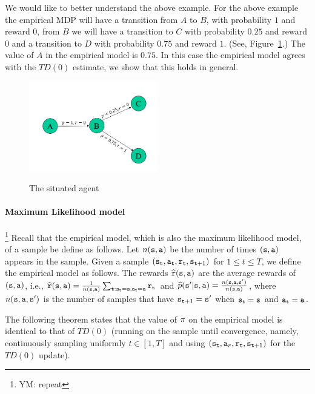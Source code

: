 We would like to better understand the above example. For the above
example the empirical MDP will have a transition from $A$ to $B$,
with probability $1$ and reward $0$, from $B$ we will have a
transition to $C$ with probability $0.25$ and reward $0$ and a
transition to $D$ with probability $0.75$ and reward $1$. (See,
Figure~\ref{fig:L7-ML}.) The value of $A$ in the empirical model is
$0.75$. In this case the empirical model agrees with the $TD(0)$
estimate, we show that this holds in general.


\begin{figure}
  \begin{centering}
  \includegraphics[width=0.5\textwidth]{figures/L7-ML}\\
  \caption{The situated agent}\label{fig:L7-ML}
  \end{centering}
\end{figure}


\paragraph{Maximum Likelihood model}\footnote{YM: repeat} Recall that the empirical model, which is also the
maximum likelihood model, of a sample be define as follows. Let
$n({\tt s},{\tt a})$ be the number of times $({\tt s},{\tt a})$
appears in the sample. Given a sample
$({\tt s}_{\tt t},{\tt a}_{\tt t},{\tt r}_{\tt t},{\tt s}_{{\tt t}+1})$
for $1\leq t\leq T$, we define the empirical model as follows. The
rewards $\widehat{{\tt r}}({\tt s},{\tt a})$ are the average rewards
of $({\tt s},{\tt a})$, i.e.,
$\widehat{{\tt r}}({\tt s},{\tt a})=\frac{1}{n({\tt s},{\tt a})}\sum_{{\tt t}:{\tt s}_{\tt t}={\tt s},{\tt a}_{\tt t}={\tt a}}{\tt r}_{\tt t}$
and
$\widehat{p}({\tt s}'|{\tt s},{\tt a})=\frac{n({\tt s},{\tt a},{\tt s}')}{n({\tt s},{\tt a})}$,
where $n({\tt s},{\tt a},{\tt s}')$ is the number of samples that have
${\tt s}_{{\tt t}+1}={\tt s}'$ when ${\tt s}_{\tt t}={\tt s}$ and
${\tt a}_{\tt t} ={\tt a}$.

The following theorem states that the value of $\pi$ on the
empirical model is identical to that of $TD(0)$ (running on the
sample until convergence, namely, continuously sampling uniformly
$t\in[1,T]$ and using $({\tt s}_{\tt t},
{\tt a}_r,{\tt r}_{\tt t},{\tt s}_{{\tt t}+1})$ for the $TD(0)$
update).

